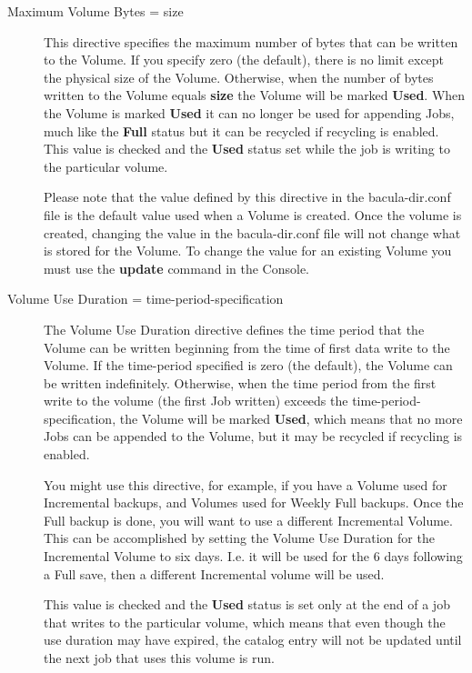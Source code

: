 \begin{description}
\item [Maximum Volume Bytes = \lt{}size\gt{}]
   This directive specifies  the maximum number of bytes that can be written to
the Volume. If  you specify zero (the default), there is no limit except the 
physical size of the Volume. Otherwise,  when the number of bytes written to
the Volume equals {\bf size}  the Volume will be marked {\bf Used}. When the
Volume is marked  {\bf Used} it can no longer be used for appending Jobs, much
like  the {\bf Full} status but it can be recycled if recycling is enabled. 
This value is checked and the {\bf Used} status set while  the job is writing
to the particular volume.  

Please note that the value defined by this directive in the  bacula-dir.conf
file is the default value used when a Volume  is created. Once the volume is
created, changing the value  in the bacula-dir.conf file will not change what
is stored  for the Volume. To change the value for an existing Volume  you
must use the {\bf update} command in the Console.  

\item [Volume Use Duration = \lt{}time-period-specification\gt{}]
   The Volume Use Duration directive defines the time period that  the Volume can
be written beginning from the time of first data  write to the Volume. If the
time-period specified is zero (the  default), the Volume can be written
indefinitely. Otherwise,  when the time period from the first write to the
volume (the  first Job written) exceeds the time-period-specification, the 
Volume will be marked {\bf Used}, which means that no more  Jobs can be
appended to the Volume, but it may be recycled if  recycling is enabled.  

You might use this directive, for example, if you have a Volume  used for
Incremental backups, and Volumes used for Weekly Full  backups. Once the Full
backup is done, you will want to use a  different Incremental Volume. This can
be accomplished by setting  the Volume Use Duration for the Incremental Volume
to six days.  I.e. it will be used for the 6 days following a Full save, then 
a different Incremental volume will be used.  

This value is checked and the {\bf Used} status is set only  at the end of a
job that writes to the particular volume, which  means that even though the
use duration may have expired, the  catalog entry will not be updated until
the next job that  uses this volume is run.  


\end{description}
